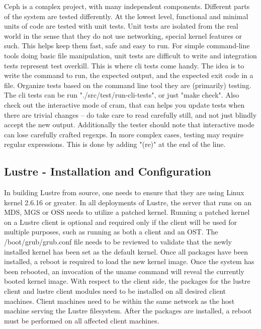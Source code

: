 \documentclass[11pt]{article}
\begin{document}
Ceph is a complex project, with many independent components. Different parts 
of the system are tested differently. At the lowest level, functional and 
minimal units of code are tested with unit tests. Unit tests are isolated 
from the real world in the sense that they do not use networking, special 
kernel features or such. This helps keep them fast, safe and easy to run.  
For simple command-line tools doing basic file manipulation, unit tests are 
difficult to write and integration tests represent test overkill. This is 
where cli tests come handy. The idea is to write the command to run, the 
expected output, and the expected exit code in a file. Organize tests based 
on the command line tool they are (primarily) testing. The cli tests can be 
run "./src/test/run-cli-tests", or just "make check". Also check out the 
interactive mode of cram, that can helps you update tests when there are 
trivial changes -- do take care to read carefully still, and not just 
blindly accept the new output.  Additionally the tester should note that 
interactive mode can lose carefully crafted regexps. In more complex cases, 
testing may require regular expressions. This is done by adding "(re)" at 
the end of the line.

\subsection{Lustre - Installation and Configuration}
In building Lustre from source, one needs to ensure that they are using 
Linux kernel 2.6.16 or greater. In all deployments of Lustre, the server 
that runs on an MDS, MGS or OSS needs to utilize a patched kernel. 
Running a patched kernel on a Lustre client is optional and required only 
if the client will be used for multiple purposes, such as running as both 
a client and an OST. The /boot/grub/grub.conf file needs to be reviewed 
to validate that the newly installed kernel has been set as the default 
kernel. Once all packages have been installed, a reboot is required to 
load the new kernel image. Once the system has been rebooted, an invocation 
of the uname command will reveal the currently booted kernel image. With 
respect to the client side, the packages for the lustre client and lustre 
client modules need to be installed on all desired client machines. Client 
machines need to be within the same network as the host machine serving the 
Lustre filesystem. After the packages are installed, a reboot must be 
performed on all affected client machines.
\end{document}
